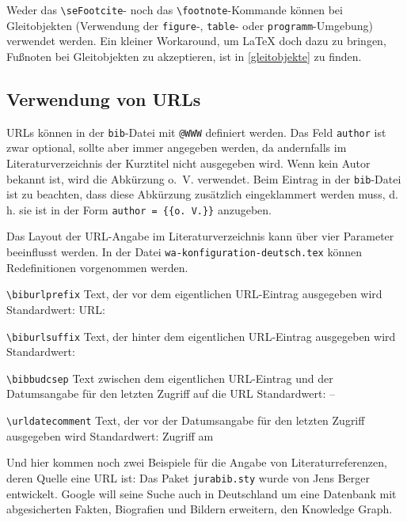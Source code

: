 Weder das \verb+\seFootcite+- noch das \verb+\footnote+-Kommande k\"onnen bei Gleitobjekten (Verwendung der \verb+figure+-, \verb+table+- oder 
\verb+programm+-Umgebung) verwendet werden. Ein kleiner Workaround, um \LaTeX{} doch dazu zu bringen, Fu{\ss}noten bei Gleitobjekten 
zu akzeptieren, ist in \vref{gleitobjekte} zu finden.



\subsection{Verwendung von URLs}

URLs k\"onnen in der \texttt{bib}-Datei mit \texttt{@WWW} definiert werden. Das Feld \texttt{author} ist zwar optional, sollte aber immer angegeben 
werden, da andernfalls im Literaturverzeichnis der Kurztitel nicht ausgegeben wird. Wenn kein Autor bekannt ist, wird die Abk\"urzung o.\ V. verwendet.
Beim Eintrag in der \texttt{bib}-Datei ist zu beachten, dass diese Abk\"urzung zus\"atzlich eingeklammert werden muss, d.\,h. sie ist in der 
Form \texttt{author = \{\{o.~V.\}\}} anzugeben. 

Das Layout der URL-Angabe im Literaturverzeichnis kann \"uber vier Parameter beeinflusst werden.  
In der Datei \texttt{wa-konfiguration-deutsch.tex} k\"onnen Redefinitionen vorgenommen werden.

\begin{seList}
\item \verb+\biburlprefix+ \newline Text, der vor dem eigentlichen URL-Eintrag ausgegeben wird \newline Standardwert: \glqq{}\jblangle{}URL: \grqq{}
\item \verb+\biburlsuffix+ \newline Text, der hinter dem eigentlichen URL-Eintrag ausgegeben wird \newline Standardwert: \glqq{}\jbrangle{}\grqq{}
\item \verb+\bibbudcsep+ \newline Text zwischen dem eigentlichen URL-Eintrag und der Datumsangabe f\"ur den letzten Zugriff auf die URL
                                         \newline Standardwert: \glqq{} -- \grqq{}
\item \verb+\urldatecomment+ \newline Text, der vor der Datumsangabe f\"ur den letzten Zugriff ausgegeben wird
                                          \newline Standardwert: \glqq{}Zugriff am\grqq{}
\end{seList}

Und hier kommen noch zwei Beispiele f\"ur die Angabe von Literaturreferenzen, deren Quelle eine URL ist:
Das Paket \texttt{jurabib.sty} wurde von Jens Berger entwickelt. 
\glqq{}Google will seine Suche auch in Deutschland um eine Datenbank mit abgesicherten Fakten, Biografien und Bildern erweitern, 
den Knowledge Graph.\grqq{}
